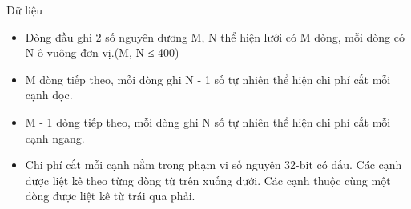 Dữ liệu
\begin{itemize}
	\item Dòng đầu ghi 2 số nguyên dương M, N thể hiện lưới có M dòng, mỗi dòng có N ô vuông đơn vị.(M, N ≤ 400)
	\item M dòng tiếp theo, mỗi dòng ghi N - 1 số tự nhiên thể hiện chi phí cắt mỗi cạnh dọc.
	\item M - 1 dòng tiếp theo, mỗi dòng ghi N số tự nhiên thể hiện chi phí cắt mỗi cạnh ngang.
	\item Chi phí cắt mỗi cạnh nằm trong phạm vi số nguyên 32-bit có dấu. Các cạnh được liệt kê theo từng dòng từ trên xuống dưới. Các cạnh thuộc cùng một dòng được liệt kê từ trái qua phải.
\end{itemize}